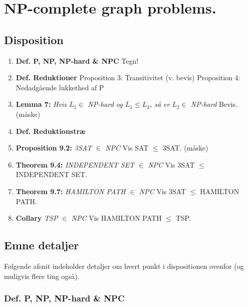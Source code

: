 \section{NP-complete graph problems.}

\subsection{Disposition}

\begin{enumerate}
 \item \textbf{Def. P, NP, NP-hard \& NPC}
    \subitem  Tegn!
 \item \textbf{Def. Reduktioner}
    \subitem  Proposition 3: Transitivitet (v. bevis)
    \subitem  Proposition 4: Nedadgående lukkethed af P  
 \item \textbf{Lemma 7:} \textit{Hvis $L_1 \in$ NP-hard og $L_1 \leq L_2$, så er $L_2 \in$ NP-hard}
    \subitem  Bevis. (måske)
 \item \textbf{Def. Reduktionstræ}
 \item \textbf{Proposition 9.2:} \textit{3SAT $\in$ NPC}
    \subitem Vis SAT $\leq$ 3SAT. (måske)
 \item \textbf{Theorem 9.4:} \textit{INDEPENDENT SET $\in$ NPC}
    \subitem Vis 3SAT $\leq$ INDEPENDENT SET.
 \item \textbf{Theorem 9.7:} \textit{HAMILTON PATH $\in$ NPC}
    \subitem Vis 3SAT $\leq$ HAMILTON PATH.
 \item \textbf{Collary} \textit{TSP $\in$ NPC}
    \subitem Vis HAMILTON PATH $\leq$ TSP.
\end{enumerate}

\subsection{Emne detaljer}

Følgende afsnit indeholder detaljer om hvert punkt i dispositionen ovenfor (og muligvis flere ting også).
\subsubsection{Def. P, NP, NP-hard \& NPC}

